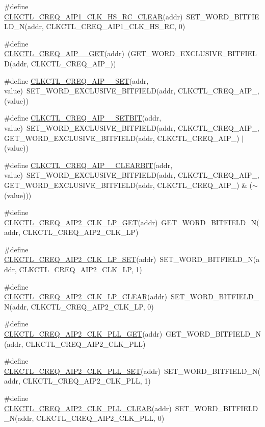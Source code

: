 \begin{DoxyCompactItemize}
\#define \hyperlink{a00544_a6c17dc0ac30d29dbbf6353c990631ea9}{CLKCTL\_\-CREQ\_\-AIP1\_\-CLK\_\-HS\_\-RC\_\-CLEAR}(addr)~SET\_\-WORD\_\-BITFIELD\_\-N(addr, CLKCTL\_\-CREQ\_\-AIP1\_\-CLK\_\-HS\_\-RC, 0)
\item 
\#define \hyperlink{a00544_ae178d2206c7adb4c6fc89e324d0fa428}{CLKCTL\_\-CREQ\_\-AIP\_\_\-GET}(addr)~(GET\_\-WORD\_\-EXCLUSIVE\_\-BITFIELD(addr, CLKCTL\_\-CREQ\_\-AIP\_))
\item 
\#define \hyperlink{a00544_ae78c2b034192328dff930821000d740e}{CLKCTL\_\-CREQ\_\-AIP\_\_\-SET}(addr, value)~SET\_\-WORD\_\-EXCLUSIVE\_\-BITFIELD(addr, CLKCTL\_\-CREQ\_\-AIP\_, (value))
\item 
\#define \hyperlink{a00544_a672a6a9a73a462432d5568fc8fc3e8b1}{CLKCTL\_\-CREQ\_\-AIP\_\_\-SETBIT}(addr, value)~SET\_\-WORD\_\-EXCLUSIVE\_\-BITFIELD(addr, CLKCTL\_\-CREQ\_\-AIP\_, GET\_\-WORD\_\-EXCLUSIVE\_\-BITFIELD(addr, CLKCTL\_\-CREQ\_\-AIP\_) $|$ (value))
\item 
\#define \hyperlink{a00544_a6835f98ea4ae2fb89e3cc467007c9805}{CLKCTL\_\-CREQ\_\-AIP\_\_\-CLEARBIT}(addr, value)~SET\_\-WORD\_\-EXCLUSIVE\_\-BITFIELD(addr, CLKCTL\_\-CREQ\_\-AIP\_, GET\_\-WORD\_\-EXCLUSIVE\_\-BITFIELD(addr, CLKCTL\_\-CREQ\_\-AIP\_) \& ($\sim$(value)))
\item 
\#define \hyperlink{a00544_adae3b614ad6a0324fc49ec89a1cfb980}{CLKCTL\_\-CREQ\_\-AIP2\_\-CLK\_\-LP\_\-GET}(addr)~GET\_\-WORD\_\-BITFIELD\_\-N(addr, CLKCTL\_\-CREQ\_\-AIP2\_\-CLK\_\-LP)
\item 
\#define \hyperlink{a00544_a37917207b1861e0092a01064afde3cce}{CLKCTL\_\-CREQ\_\-AIP2\_\-CLK\_\-LP\_\-SET}(addr)~SET\_\-WORD\_\-BITFIELD\_\-N(addr, CLKCTL\_\-CREQ\_\-AIP2\_\-CLK\_\-LP, 1)
\item 
\#define \hyperlink{a00544_ac8156a17b143180cbf5f86cd16af1f9e}{CLKCTL\_\-CREQ\_\-AIP2\_\-CLK\_\-LP\_\-CLEAR}(addr)~SET\_\-WORD\_\-BITFIELD\_\-N(addr, CLKCTL\_\-CREQ\_\-AIP2\_\-CLK\_\-LP, 0)
\item 
\#define \hyperlink{a00544_a9eb46f8157fb8af51b0e6d94fe76c815}{CLKCTL\_\-CREQ\_\-AIP2\_\-CLK\_\-PLL\_\-GET}(addr)~GET\_\-WORD\_\-BITFIELD\_\-N(addr, CLKCTL\_\-CREQ\_\-AIP2\_\-CLK\_\-PLL)
\item 
\#define \hyperlink{a00544_a3530703b8e201ce5704ef1de85edde93}{CLKCTL\_\-CREQ\_\-AIP2\_\-CLK\_\-PLL\_\-SET}(addr)~SET\_\-WORD\_\-BITFIELD\_\-N(addr, CLKCTL\_\-CREQ\_\-AIP2\_\-CLK\_\-PLL, 1)
\item 
\#define \hyperlink{a00544_aed57517ecc19e2bed16f2cb90088c776}{CLKCTL\_\-CREQ\_\-AIP2\_\-CLK\_\-PLL\_\-CLEAR}(addr)~SET\_\-WORD\_\-BITFIELD\_\-N(addr, CLKCTL\_\-CREQ\_\-AIP2\_\-CLK\_\-PLL, 0)

\end{DoxyCompactItemize}
